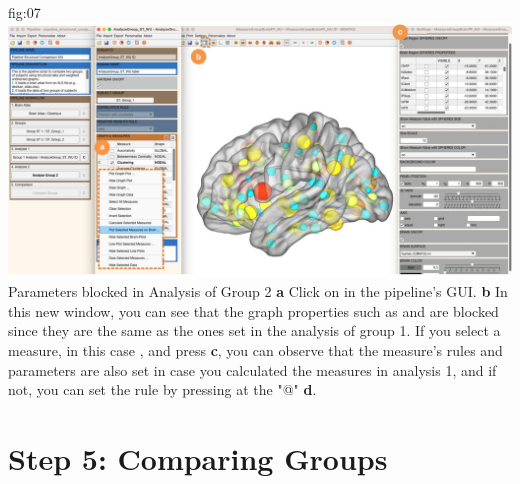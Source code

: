\documentclass[justified]{tufte-handout}
\begin{document}
	{fig:07}
	{
	\includegraphics{fig07.jpg}
	}
	{Parameters blocked in Analysis of Group 2}
	{
	{\bf a} Click on  in the pipeline's GUI.
	{\bf b} In this new window, you can see that the graph properties such as  and  are blocked since they are the same as the ones set in the analysis of group 1. If you select a measure, in this case , and press  {\bf c}, you can observe that the measure's rules and parameters are also set in case you calculated the measures in analysis 1, and if not, you can set the rule by pressing at the "@" {\bf d}.
	}
 
\section{Step 5: Comparing Groups}
\end{document}
